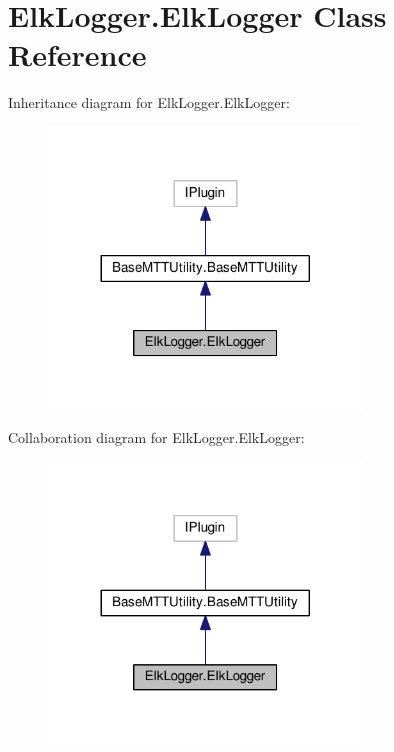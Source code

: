 \hypertarget{class_elk_logger_1_1_elk_logger}{\section{Elk\-Logger.\-Elk\-Logger Class Reference}
\label{class_elk_logger_1_1_elk_logger}
}


Inheritance diagram for Elk\-Logger.\-Elk\-Logger\-:
\nopagebreak
\begin{figure}[H]
\begin{center}
\leavevmode
\includegraphics[width=236pt]{class_elk_logger_1_1_elk_logger__inherit__graph}
\end{center}
\end{figure}


Collaboration diagram for Elk\-Logger.\-Elk\-Logger\-:
\nopagebreak
\begin{figure}[H]
\begin{center}
\leavevmode
\includegraphics[width=236pt]{class_elk_logger_1_1_elk_logger__coll__graph}
\end{center}
\end{figure}
